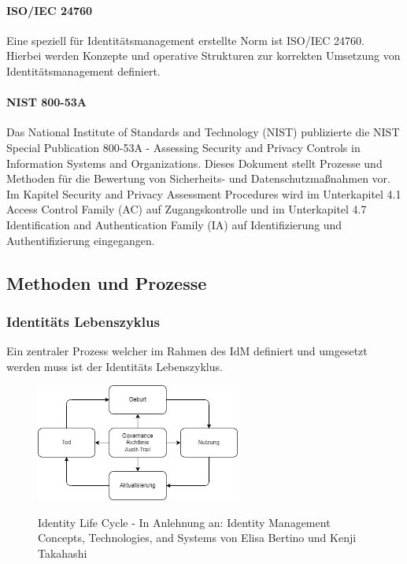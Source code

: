 \documentclass[11pt]{article}
\begin{document}
\paragraph{ISO/IEC 24760}
Eine speziell für Identitätsmanagement erstellte Norm ist ISO/IEC 24760. Hierbei werden Konzepte und operative Strukturen zur korrekten Umsetzung von Identitätsmanagement definiert.~\cite{isoiec24760}
\paragraph{NIST 800-53A}
Das National Institute of Standards and Technology (NIST) publizierte die \glqq{}NIST Special Publication 800-53A - Assessing Security and Privacy Controls in Information Systems and Organizations\grqq{}. Dieses Dokument stellt Prozesse und Methoden für die Bewertung von Sicherheits- und Datenschutzmaßnahmen vor. Im Kapitel \glqq{}Security and Privacy Assessment Procedures\grqq{} wird im Unterkapitel 4.1 \glqq{}Access Control Family (AC)\grqq{} auf Zugangskontrolle und im Unterkapitel 4.7 \glqq{}Identification and Authentication Family (IA)\grqq{} auf Identifizierung und Authentifizierung eingegangen.
\subsection{Methoden und Prozesse}
\subsubsection{Identitäts Lebenszyklus}
Ein zentraler Prozess welcher im Rahmen des IdM definiert und umgesetzt werden muss ist der Identitäts Lebenszyklus.
\begin{figure}[H]
  \centering
  \includegraphics[width=0.6\textwidth]{assets/idlc.png}
  \label{fig:idlc}
  \caption{Identity Life Cycle - In Anlehnung an: Identity Management Concepts, Technologies, and Systems von Elisa Bertino und Kenji Takahashi}
\end{figure}
\end{document}
